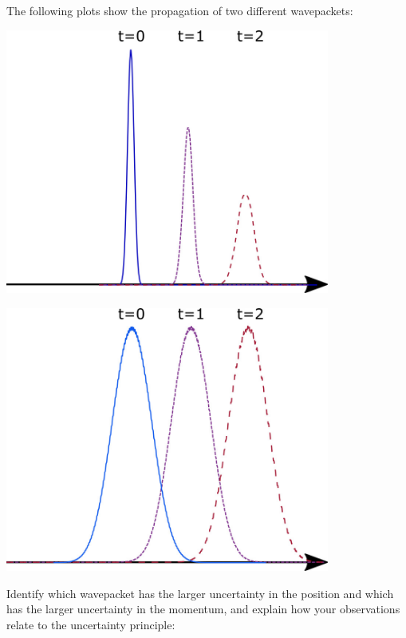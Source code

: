 \begin{questions}
	\vspace{0.3in}
	
	\contdnewpg

\question The following plots show the propagation of two different wavepackets:

      	\vspace{0.2in}
	\begin{minipage}{0.5\textwidth}
	\centerline{\includegraphics[width=0.8\textwidth]{includes/wavepackets-FIGURES/prop1.jpg}}
	\end{minipage}
	\begin{minipage}{0.5\textwidth}
	\centerline{\includegraphics[width=0.8\textwidth]{includes/wavepackets-FIGURES/prop2.jpg}}
	\end{minipage}
	\vspace{0.1in}

Identify which wavepacket has the larger uncertainty in the position and which has the larger uncertainty in the momentum, and explain how your observations relate to the uncertainty principle:
	
	\vspace{3.25in}

\end{questions}
